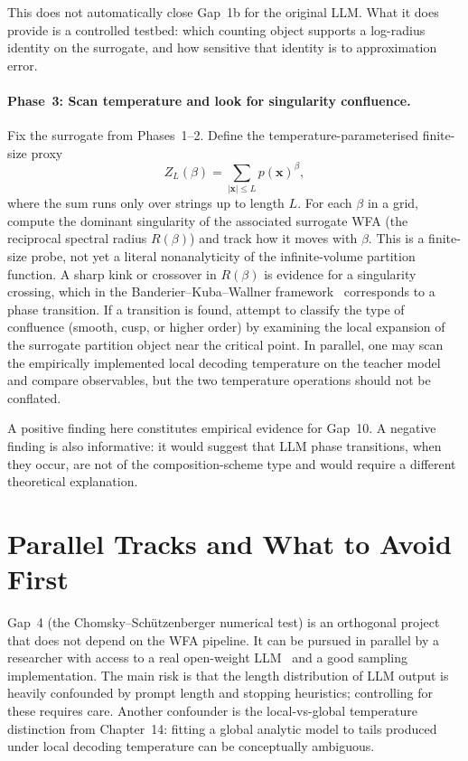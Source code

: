 This does not automatically close Gap~1b for the original LLM. What it
does provide is a controlled testbed: which counting object supports a
log-radius identity on the surrogate, and how sensitive that identity is
to approximation error.

\paragraph{Phase~3: Scan temperature and look for singularity
confluence.}
\label{ch19:phase3}

Fix the surrogate from Phases~1--2.  Define the temperature-parameterised
finite-size proxy
\[
Z_L(\beta) = \sum_{|\mathbf{x}| \le L} p(\mathbf{x})^\beta,
\]
where the sum runs only over strings up to length $L$.  For each
$\beta$ in a grid, compute the dominant singularity of the associated
surrogate WFA (the reciprocal spectral radius $R(\beta)$) and track how
it moves with $\beta$.  This is a finite-size probe, not yet a literal
nonanalyticity of the infinite-volume partition function.  A sharp kink
or crossover in $R(\beta)$ is evidence for a singularity crossing, which
in the
Banderier--Kuba--Wallner framework~\cite{BanderierKubaWallner2021}
corresponds to a phase transition.  If a transition is found, attempt to
classify the type of confluence (smooth, cusp, or higher order) by
examining the local expansion of the surrogate partition object near the critical
point.
In parallel, one may scan the empirically implemented local decoding
temperature on the teacher model and compare observables, but the two
temperature operations should not be conflated.

A positive finding here constitutes empirical evidence for Gap~10.  A
negative finding is also informative: it would suggest that LLM phase
transitions, when they occur, are not of the composition-scheme type
and would require a different theoretical explanation.

\section{Parallel Tracks and What to Avoid First}
\label{ch19:parallel}

Gap~4 (the Chomsky--Schützenberger numerical test) is an orthogonal
project that does not depend on the WFA pipeline.  It can be pursued
in parallel by a researcher with access to a real open-weight
LLM~\cite{BlondelEtAl2025,DuEtAl2023} and a good sampling implementation.
The main risk is that the length distribution of LLM output is heavily
confounded by prompt length and stopping heuristics; controlling for
these requires care. Another confounder is the local-vs-global
temperature distinction from Chapter~14: fitting a global analytic model
to tails produced under local decoding temperature can be conceptually
ambiguous.

